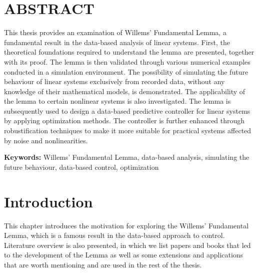 \documentclass[12pt,a4paper]{report}
\newcommand{\frontmatterchapter}[1]{%
    \chapter*{#1}%
    \addcontentsline{toc}{chapter}{#1}%
}
\begin{document}
\frontmatterchapter{ABSTRACT}
This thesis provides an examination of Willems' Fundamental Lemma, a fundamental result in the data-based analysis of linear systems.
First, the theoretical foundations required to understand the lemma are presented, together with its proof. The lemma is then validated through various numerical examples conducted in a simulation environment.
The possibility of simulating the future behaviour of linear systems exclusively from recorded data, without any knowledge of their mathematical models, is demonstrated. The applicability of the lemma to certain nonlinear systems is also investigated.
The lemma is subsequently used to design a data-based predictive controller for linear systems by applying optimization methods. The controller is further enhanced through robustification techniques to make it more suitable for practical systems affected by noise and nonlinearities.

\vspace{8mm}
\noindent\textbf{Keywords:} {Willems' Fundamental Lemma, data-based analysis, simulating the future behaviour, data-based control, optimization}
\clearpage

\setcounter{page}{1}

\chapter{Introduction}

This chapter introduces the motivation for exploring the Willems' Fundamental Lemma, which is a famous result in the data-based approach to control. Literature overview is also presented, in which we list
papers and books that led to the development of the Lemma as well as some extensions and applications that are worth mentioning and are used in the rest of the thesis.
\end{document}
